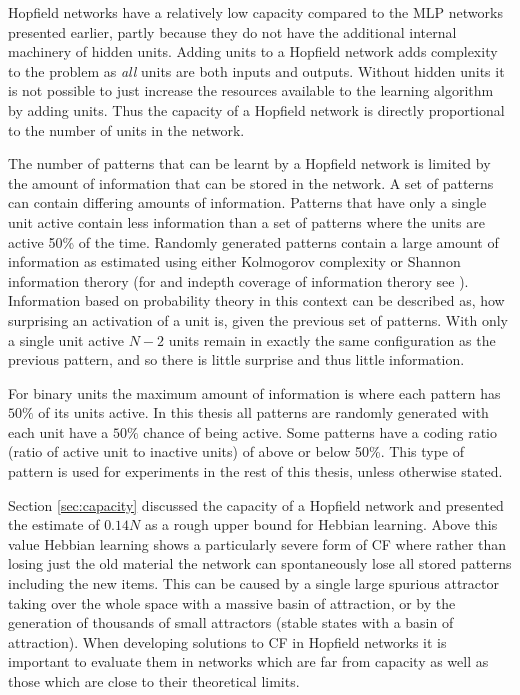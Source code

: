 Hopfield networks have a relatively low capacity compared to the MLP networks presented earlier, partly because they do not have the additional internal machinery of hidden units.  Adding units to a Hopfield network adds complexity to the problem as \emph{all} units are both inputs and outputs.  Without hidden units it is not possible to just increase the resources available to the learning algorithm by adding units.  Thus the capacity of a Hopfield network is directly proportional to the number of units in the network.

The number of patterns that can be learnt by a Hopfield network is limited by the amount of information that can be stored in the network.  A set of patterns can contain differing amounts of information.  Patterns that have only a single unit active contain less information than a set of patterns where the units are active 50\% of the time.  Randomly generated patterns contain a large amount of information as estimated using either Kolmogorov complexity or Shannon information therory (for and indepth coverage of information therory see \citet{Cover1991}). Information based on probability theory in this context can be described as, how surprising an activation of a unit is, given the previous set of patterns.  With only a single unit active $N-2$ units remain in exactly the same configuration as the previous pattern, and so there is little surprise and thus little information.

For binary units the maximum amount of information is where each pattern has $50\%$ of its units active.  In this thesis all patterns are randomly generated with each unit have a $50\%$ chance of being active.  Some patterns have a coding ratio (ratio of active unit to inactive units) of above or below 50\%.  This type of pattern is used for experiments in the rest of this thesis, unless otherwise stated.

Section \ref{sec:capacity} discussed the capacity of a Hopfield network and presented the estimate of $0.14N$ as a rough upper bound for Hebbian learning. Above this value Hebbian learning shows a particularly severe form of CF where rather than losing just the old material the network can spontaneously lose all stored patterns including the new items.  This can be caused by a single large spurious attractor taking over the whole space with a massive basin of attraction, or by the generation of thousands of small attractors (stable states with a basin of attraction).  When developing solutions to CF in Hopfield networks it is important to evaluate them in networks which are far from capacity as well as those which are close to their theoretical limits.

